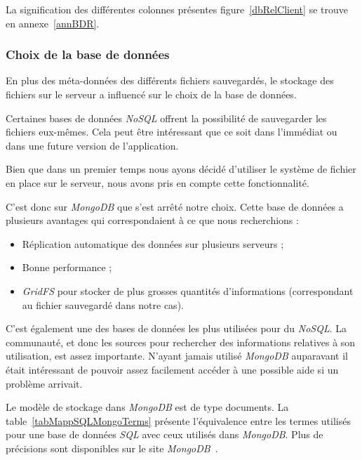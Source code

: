 \documentclass[a4paper,10pt, twoside]{report}
\begin{document}
\begin{spacing}{1.2}
La signification des différentes colonnes présentes figure~\ref{dbRelClient}
se trouve en annexe~\ref{annBDR}.

\subsubsection{Choix de la base de données}

En plus des méta-données des différents fichiers sauvegardés, le stockage des
fichiers sur le serveur a influencé sur le choix de la base de données. 

Certaines bases de données \textit{NoSQL} offrent la possibilité de sauvegarder
les fichiers eux-mêmes. Cela peut être intéressant que ce soit dans l'immédiat
ou dans une future version de l'application.

Bien que dans un premier temps nous ayons décidé d'utiliser le système de
fichier en place sur le serveur, nous avons pris en compte cette
fonctionnalité.

C'est donc sur \textit{MongoDB} que s'est arrêté notre choix. Cette base de
données a plusieurs avantages qui correspondaient à ce que nous recherchions :

\begin{itemize}
 \item Réplication automatique des données sur plusieurs serveurs ;
 \item Bonne performance ;
 \item \textit{GridFS} pour stocker de plus grosses quantités d'informations
 (correspondant au fichier sauvegardé dans notre cas).
\end{itemize}

C'est également une des bases de données les plus utilisées pour du
\textit{NoSQL}. La communauté, et donc les sources pour rechercher des
informations relatives à son utilisation, est assez importante. N'ayant jamais
utilisé \textit{MongoDB} auparavant il était intéressant de pouvoir assez
facilement accéder à une possible aide si un problème arrivait.

Le modèle de stockage dans \textit{MongoDB} est de type documents. La
table~\ref{tabMappSQLMongoTerms} présente l'équivalence entre les termes
utilisés pour une base de données \textit{SQL} avec ceux utilisés dans
\textit{MongoDB}. Plus de précisions sont disponibles sur le site
\textit{MongoDB}~\cite{refMappingSQLMDB}.


\end{spacing}
\end{document}
